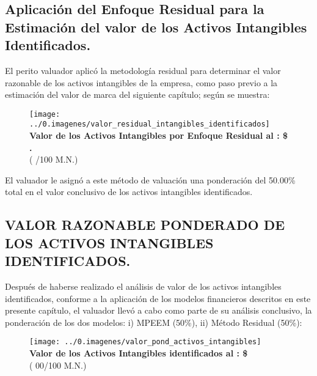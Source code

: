 \subsection{Aplicaci\'on del Enfoque Residual para la Estimaci\'on del valor de los Activos Intangibles Identificados.}

El perito valuador aplic\'o la metodolog\'ia residual para determinar el valor razonable de los activos intangibles de la empresa, como paso previo a la estimaci\'on del valor de marca del siguiente cap\'itulo; seg\'un se muestra:\\

\begin{figure}[H]
\centering
\texttt{[image: ../0.imagenes/valor\_residual\_intangibles\_identificados]}\\[10pt]


\textcolor{principal}{\textbf{Valor de los Activos Intangibles  por Enfoque Residual al \fechaValoresCorto: \$\valorResidual{} \monedaCode.}}\\
(\textcolor{principal}{\valorResidualLetra{} /100 M.N.})

\end{figure}


El valuador le asign\'o a este m\'etodo de valuaci\'on una ponderaci\'on del 50.00\% total en el valor conclusivo de los  activos intangibles identificados.


\subsection{VALOR RAZONABLE PONDERADO DE LOS ACTIVOS INTANGIBLES IDENTIFICADOS.}

Despu\'es de haberse realizado el an\'alisis de valor de los activos intangibles identificados, conforme a la aplicaci\'on de los modelos financieros descritos en este presente cap\'itulo, el valuador llev\'o a cabo como parte de su an\'alisis conclusivo, la ponderaci\'on de los dos modelos: i) MPEEM (50\%), ii) Método Residual  (50\%):

\begin{figure}[H]
\centering
\texttt{[image: ../0.imagenes/valor\_pond\_activos\_intangibles]}\\[10pt]

\textbf{\textcolor{principal}{Valor de los  Activos Intangibles identificados al \fechaValoresCorto:} \$\valorActivoIntangible{} \monedaCode}\\[5pt]
(\textcolor{principal}{\valorActivoIntangibleLetra{} \moneda{} 00/100 M.N.})


\end{figure}






